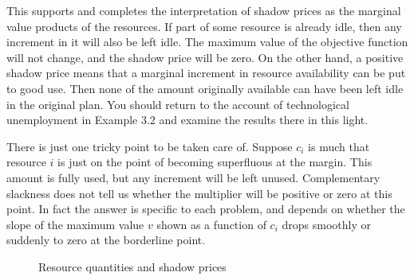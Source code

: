 This supports and completes the interpretation of shadow prices as the marginal value products of the resources. If part of some resource is already idle, then any increment in it will also be left idle. The maximum value of the objective function will not change, and the shadow price will be zero. On the other hand, a positive shadow price means that a marginal increment in resource availability can be put to good use. Then none of the amount originally available can have been left idle in the original plan. You should return to the account of technological unemployment in Example 3.2 and examine the results there in this light.

There is just one tricky point to be taken care of. Suppose $c_i$ is much that resource $i$ is just on the point of becoming superfluous at the margin. This amount is fully used, but any increment will be left unused. Complementary slackness does not tell us whether the multiplier will be positive or zero at this point. In fact the answer is specific to each problem, and depends on whether the slope of the maximum value $v$ shown as a function of $c_i$ drops smoothly or suddenly to zero at the borderline point.

\begin{figure}[!htp]  %
 \centering
 \caption{Resource quantities and shadow prices} \label{Fig4.1} 
\end{figure}


